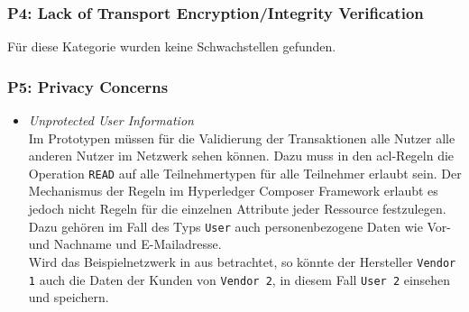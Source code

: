         \subsubsection*{P4: Lack of Transport Encryption/Integrity Verification}
            Für diese Kategorie wurden keine Schwachstellen gefunden. 
            
        \subsubsection*{P5: Privacy Concerns}
            \begin{itemize}[leftmargin=0cm,label={}]
                \item \emph{Unprotected User Information}\label{vuln:prototype_userdata}\\
                    Im Prototypen müssen für die Validierung der Transaktionen alle Nutzer alle anderen Nutzer im Netzwerk sehen können. 
                    Dazu muss in den \gls{acl}-Regeln die Operation \colorbox{light-gray}{\lstinline{READ}} auf alle Teilnehmertypen für alle Teilnehmer erlaubt sein. 
                    Der Mechanismus der Regeln im Hyperledger Composer Framework erlaubt es jedoch nicht Regeln für die einzelnen Attribute jeder Ressource festzulegen. 
                    Dazu gehören im Fall des Typs \colorbox{light-gray}{\lstinline{User}} auch personenbezogene Daten wie Vor- und Nachname und E-Mailadresse.\\
                    Wird das Beispielnetzwerk in  aus  betrachtet, so könnte der Hersteller \colorbox{light-gray}{\lstinline{Vendor 1}} auch die Daten der Kunden von \colorbox{light-gray}{\lstinline{Vendor 2}}, in diesem Fall \colorbox{light-gray}{\lstinline{User 2}} einsehen und speichern.
            \end{itemize}
            
